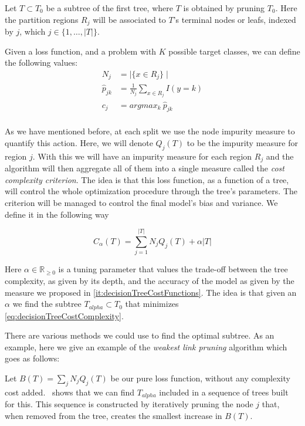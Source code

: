 Let $T \subset T_0$ be a subtree of the first tree, where $T$ is obtained by pruning $T_0$. Here the partition regions $R_j$ will be associated to $T$'s terminal nodes or leafs, indexed by $j$, which $j \in \{1,\ldots,|T| \}$.

Given a loss function, and a problem with $K$ possible target classes, we can define the following values:
\begin{equation}
\begin{split}
N_j & = \mid \{x \in R_j \}\mid \\
\hat{p}_{jk} & = \frac{1}{N_j} \sum_{x \in R_j} I(y=k)\\
c_j & = argmax_{k} \ \hat{p}_{jk} \\
\end{split}
\end{equation}\label{eq:decisionTreePruneParameters}

As we have mentioned before, at each split we use the node impurity measure to quantify this action. Here, we will denote $Q_j(T)$ to be the impurity measure for region $j$.
With this we will have an impurity measure for each region $R_j$ and the algorithm will then aggregate all of them into a single measure called the \textit{cost complexity criterion}. The idea is that this loss function, as a function of a tree, will control the whole optimization procedure through the tree's parameters. The criterion will be managed to control the final model's bias and variance. We define it in the following way

\begin{equation}
C_\alpha(T) = \sum_{j=1}^{|T|} N_j Q_j(T) + \alpha|T|
\end{equation}\label{eq:decisionTreeCostComplexity}


Here $\alpha \in \mathbb{R}_{\geq 0}$ is a tuning parameter that values the trade-off between the tree complexity, as given by its depth, and the accuracy of the model as given by the measure we proposed in \cref{it:decisionTreeCostFunctions}. The idea is that given an $\alpha$ we find the subtree $T_{alpha} \subset T_0$ that minimizes \cref{eq:decisionTreeCostComplexity}.

There are various methods we could use to find the optimal subtree. As an example, here we give an example of the \textit{weakest link pruning} algorithm which goes as follows:

Let $B(T) = \sum_{j} N_j Q_j(T) $ be our pure loss function, without any complexity cost added.~\citep{breiman-cart84} shows that we can find $T_{alpha}$ included in a sequence of trees built for this. This sequence is constructed by iteratively pruning the node $j$ that, when removed from the tree, creates the smallest increase in $B(T)$.


